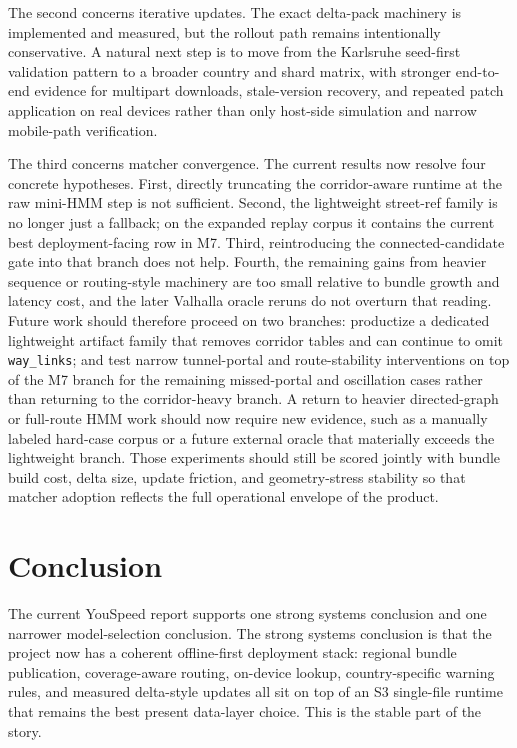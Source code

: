 \documentclass{article}
\begin{document}
The second concerns iterative updates. The exact delta-pack machinery is implemented and measured, but the rollout path remains intentionally conservative. A natural next step is to move from the Karlsruhe seed-first validation pattern to a broader country and shard matrix, with stronger end-to-end evidence for multipart downloads, stale-version recovery, and repeated patch application on real devices rather than only host-side simulation and narrow mobile-path verification.

The third concerns matcher convergence. The current results now resolve four concrete hypotheses. First, directly truncating the corridor-aware runtime at the raw mini-HMM step is not sufficient. Second, the lightweight street-ref family is no longer just a fallback; on the expanded replay corpus it contains the current best deployment-facing row in M7. Third, reintroducing the connected-candidate gate into that branch does not help. Fourth, the remaining gains from heavier sequence or routing-style machinery are too small relative to bundle growth and latency cost, and the later Valhalla oracle reruns do not overturn that reading. Future work should therefore proceed on two branches: productize a dedicated lightweight artifact family that removes corridor tables and can continue to omit \texttt{way\_links}; and test narrow tunnel-portal and route-stability interventions on top of the M7 branch for the remaining missed-portal and oscillation cases rather than returning to the corridor-heavy branch. A return to heavier directed-graph or full-route HMM work should now require new evidence, such as a manually labeled hard-case corpus or a future external oracle that materially exceeds the lightweight branch. Those experiments should still be scored jointly with bundle build cost, delta size, update friction, and geometry-stress stability so that matcher adoption reflects the full operational envelope of the product.

\section{Conclusion}
The current YouSpeed report supports one strong systems conclusion and one narrower model-selection conclusion. The strong systems conclusion is that the project now has a coherent offline-first deployment stack: regional bundle publication, coverage-aware routing, on-device lookup, country-specific warning rules, and measured delta-style updates all sit on top of an S3 single-file runtime that remains the best present data-layer choice. This is the stable part of the story.
\end{document}
